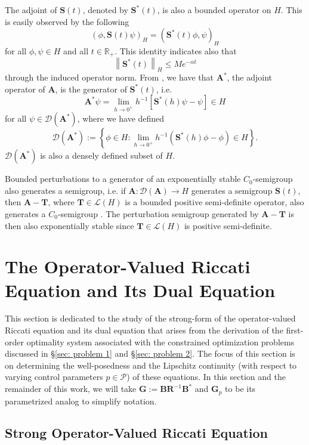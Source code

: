 \documentclass{amsart}
\newcommand{\sL}{\mathscr L}
\newcommand{\p}[1]{\left( {#1} \right)}
\newcommand{\norm}[1]{\left\| #1 \right\|}
\newcommand{\br}[1]{\left[ #1 \right]}
\newcommand{\Br}[1]{\left\{ #1 \right\}}
\newcommand{\sP}{\mathcal{P}}
\newcommand{\bA}{\mathbf A}
\newcommand{\bG}{\mathbf G}
\newcommand{\bS}{\mathbf S}
\newcommand{\bT}{\mathbf T}
\begin{document}
The adjoint of $\bS(t)$, denoted by $\bS^*(t)$, is also a bounded operator on $H$. This is easily observed by the following
$$
    \p{\phi, \bS(t)\psi}_H =\p{\bS^*(t)\phi, \psi}_H
$$
for all $\phi,\psi \in H$ and all $t \in \mathbb R_+$. This identity indicates also that
$$
    \norm{\bS^*(t)}_H \leq Me^{-\alpha t}
$$
through the induced operator norm. From \cite[Thoerem 4.3]{goldstein2017semigroups}, we have that
$\bA^*$, the adjoint operator of $\bA$, is the generator of $\bS^*(t)$, i.e.
\begin{equation} \label{eqn: A* def}
\bA^*\psi = \lim_{h \rightarrow 0^+} h^{-1}\br{\bS^*(h) \psi - \psi}\in H
\end{equation}
for all $\psi \in \mathcal D(\bA^*)$, where we have defined
$$
\mathcal D(\bA^*) := \Br{\phi \in H: \lim_{h \rightarrow 0^+} h^{-1}\p{\bS^*(h)\phi - \phi}  \in H}.
$$
$\mathcal D(\bA^*)$ is also a densely defined subset of $H$. 

Bounded perturbations to a generator of an exponentially stable $C_0$-semigroup also generates a semigroup, i.e. if $\bA: \mathcal D(\bA) \rightarrow H$ generates a semigroup $\bS(t)$, then $\bA-\bT$, where $\bT \in \sL\p{H}$ is a bounded positive semi-definite operator, also generates a $C_0$-semigroup \cite[Theorem 6.4]{goldstein2017semigroups}. The perturbation semigroup generated by $\bA-\bT$ is then also exponentially stable since $\bT\in \sL\p{H}$ is positive semi-definite.

\section{The Operator-Valued Riccati Equation and Its Dual Equation}
\label{sec: primal and dual}

This section is dedicated to the study of the strong-form of the operator-valued Riccati equation and its dual equation that arises from the derivation of the first-order optimality system associated with the constrained optimization problems discussed in \S\ref{sec: problem 1} and \S\ref{sec: problem 2}. The focus of this section is on determining the well-posedness and the Lipschitz continuity (with respect to varying control parameters $p \in \sP$) of these equations. In this section and the remainder of this work, we will take $\bG:= \mathbf B\mathbf R^{-1} \mathbf B^*$ and $\bG_p$ to be its parametrized analog to simplify notation. 

\subsection{Strong Operator-Valued Riccati Equation}
\end{document}
